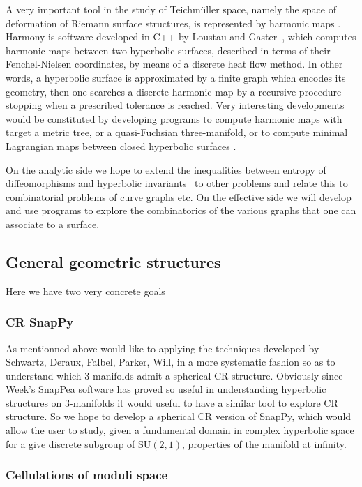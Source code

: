 \documentclass[14pt,fleqn]{article}
\begin{document}
A very important tool in the study of Teichm\" {u}ller space, namely the
space of deformation of Riemann surface structures, is represented by
harmonic maps 
\cite{wolf} \cite{kajigaya2019uniformizing}. Harmony is  software developed in C++ by
Loustau and Gaster~\cite{glm-cdehm-18}, which computes harmonic maps between two
hyperbolic surfaces, 
described in terms of their Fenchel-Nielsen
coordinates, 
by means of a discrete heat flow method. In other words,
a hyperbolic surface is 
approximated by a finite graph 
which encodes its geometry, 
then one searches a discrete harmonic 
map by a  recursive procedure 
stopping when  a prescribed tolerance is reached. 
Very interesting developments would be
constituted by developing programs to compute harmonic maps with
target a metric tree, 
or a quasi-Fuchsian three-manifold, or to
compute minimal Lagrangian maps between closed hyperbolic surfaces \cite{BS}.


On the analytic side we hope to extend the
inequalities between entropy of diffeomorphisms and hyperbolic
invariants~\cite{km-nevvp-18} to other problems and relate this to combinatorial problems
of curve graphs etc. On the effective side we will develop and use
programs to explore the combinatorics of the various graphs that one
can associate to a surface.

\subsection{General geometric structures}

Here we have two very concrete goals

\subsubsection{CR SnapPy}
As mentionned above would like to applying the  techniques developed 
by Schwartz, Deraux, Falbel, Parker, Will, in a
more systematic fashion so as to understand
which 3-manifolds admit a spherical CR structure.
Obviously since Week's SnapPea software 
has proved so useful in understanding 
hyperbolic structures on 3-manifolds
it would useful to have a similar tool
to explore CR structure.
So we hope to develop a spherical CR version of SnapPy,
which would allow the user to study, 
given a fundamental domain 
in complex hyperbolic space  for a
give discrete subgroup of $\mathrm{SU}(2,1)$, properties of the  manifold at infinity.


\subsubsection{Cellulations of moduli space}
\end{document}
